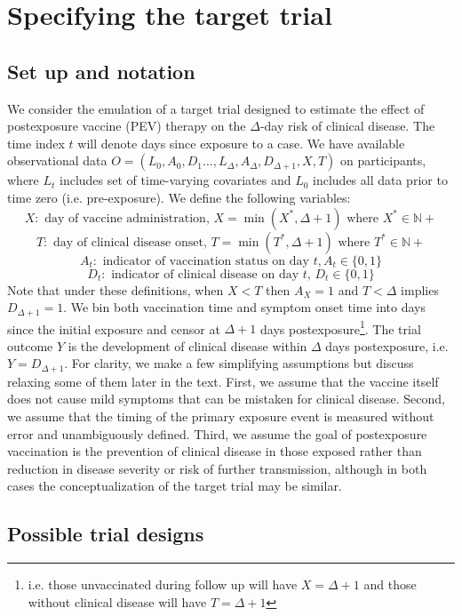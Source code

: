 \documentclass[11pt]{article}
\begin{document}
\section{Specifying the target trial}

\subsection{Set up and notation} \label{sec:setup}
We consider the emulation of a target trial designed to estimate the effect of postexposure vaccine (PEV) therapy on the $\Delta$-day risk of clinical disease. The time index $t$ will denote days since exposure to a case. We have available observational data $O=\left(L_0, A_0, D_1 \ldots, L_\Delta, A_\Delta, D_{\Delta+1}, X, T\right)$ on participants, where $L_t$ includes set of time-varying covariates and $L_0$ includes all data prior to time zero (i.e. pre-exposure). We define the following variables:
$$X: \text{ day of vaccine administration, } X = \operatorname{min}(X^*, \Delta + 1) \text{ where } X^* \in \mathbb{N}+$$
$$T: \text{ day of clinical disease onset, } T = \operatorname{min}(T^*, \Delta + 1) \text{ where } T^* \in \mathbb{N}+$$
$$A_t: \text{ indicator of vaccination status on day }t, A_t \in \{0, 1\}$$
$$D_t: \text{ indicator of clinical disease on day $t$, } D_t \in \{0, 1\}$$
Note that under these definitions, when $X < T$ then $A_X = 1$ and $T < \Delta$ implies $D_{\Delta + 1} = 1$. We bin both vaccination time and symptom onset time into days since the initial exposure and censor at $\Delta + 1$ days postexposure\footnote{i.e. those unvaccinated during follow up will have $X = \Delta + 1$ and those without clinical disease will have $T = \Delta + 1$}. The trial outcome $Y$ is the development of clinical disease within $\Delta$ days postexposure, i.e. $Y=D_{\Delta + 1}$. For clarity, we make a few simplifying assumptions but discuss relaxing some of them later in the text. First, we assume that the vaccine itself does not cause mild symptoms that can be mistaken for clinical disease. Second, we assume that the timing of the primary exposure event is measured without error and unambiguously defined. Third, we assume the goal of postexposure vaccination is the prevention of clinical disease in those exposed rather than reduction in disease severity or risk of further transmission, although in both cases the conceptualization of the target trial may be similar.

\subsection{Possible trial designs}
\end{document}
